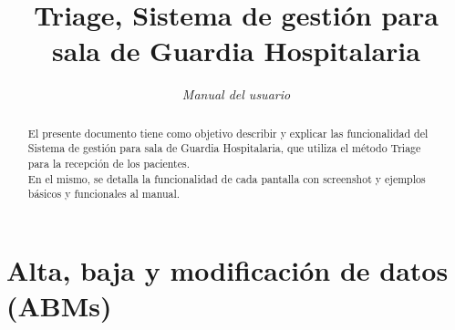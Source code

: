 \documentclass[a4paper,10pt]{article}
\title{Triage, Sistema de gestión para sala de Guardia Hospitalaria}
\author{\textit{Manual del usuario}}
\begin{document}
\maketitle
\newpage 

\begin{abstract}
El presente documento tiene como objetivo describir y explicar las funcionalidad del Sistema de gestión para sala de Guardia Hospitalaria, que utiliza el método Triage para la recepción de los pacientes.\\
En el mismo, se detalla la funcionalidad de cada pantalla con screenshot y ejemplos básicos y funcionales al manual.\\

\end{abstract}


\newpage 
\tableofcontents

\newpage 
\section{Alta, baja y modificación de datos (ABMs)}

\end{document}
